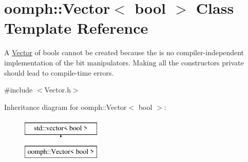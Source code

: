 \hypertarget{classoomph_1_1Vector_3_01bool_01_4}{}\section{oomph\+:\+:Vector$<$ bool $>$ Class Template Reference}
\label{classoomph_1_1Vector_3_01bool_01_4}


A \hyperlink{classoomph_1_1Vector}{Vector} of bools cannot be created because the is no compiler-\/independent implementation of the bit manipulators. Making all the constructors private should lead to compile-\/time errors.  




{\ttfamily \#include $<$Vector.\+h$>$}

Inheritance diagram for oomph\+:\+:Vector$<$ bool $>$\+:\begin{figure}[H]
\begin{center}
\leavevmode
\includegraphics[height=2.000000cm]{classoomph_1_1Vector_3_01bool_01_4}
\end{center}
\end{figure}
